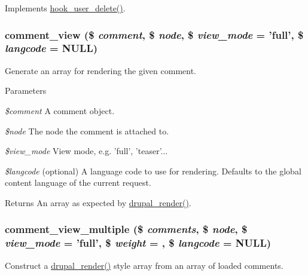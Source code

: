 \label{comment_8module_a9534e778a7cbfe56fd750997c8998ad8}
Implements \hyperlink{group__hooks_ga2c0755857e486e8a770b44b496da9929}{hook\_\-user\_\-delete()}. \hypertarget{comment_8module_a68dd73af772c948e0f8a6cb144bef2cf}{
\subsubsection[{comment\_\-view}]{\setlength{\rightskip}{0pt plus 5cm}comment\_\-view (\$ {\em comment}, \/  \$ {\em node}, \/  \$ {\em view\_\-mode} = {\ttfamily 'full'}, \/  \$ {\em langcode} = {\ttfamily NULL})}}
\label{comment_8module_a68dd73af772c948e0f8a6cb144bef2cf}
Generate an array for rendering the given comment.


\begin{DoxyParams}{Parameters}
\item[{\em \$comment}]A comment object. \item[{\em \$node}]The node the comment is attached to. \item[{\em \$view\_\-mode}]View mode, e.g. 'full', 'teaser'... \item[{\em \$langcode}](optional) A language code to use for rendering. Defaults to the global content language of the current request.\end{DoxyParams}
\begin{DoxyReturn}{Returns}
An array as expected by \hyperlink{common_8inc_a05798b44e8d6c496d4bee5cc32fa7851}{drupal\_\-render()}. 
\end{DoxyReturn}
\hypertarget{comment_8module_add3fefcb6c60f8785d2c11cd49994681}{
\subsubsection[{comment\_\-view\_\-multiple}]{\setlength{\rightskip}{0pt plus 5cm}comment\_\-view\_\-multiple (\$ {\em comments}, \/  \$ {\em node}, \/  \$ {\em view\_\-mode} = {\ttfamily 'full'}, \/  \$ {\em weight} = {}, \/  \$ {\em langcode} = {\ttfamily NULL})}}
\label{comment_8module_add3fefcb6c60f8785d2c11cd49994681}
Construct a \hyperlink{common_8inc_a05798b44e8d6c496d4bee5cc32fa7851}{drupal\_\-render()} style array from an array of loaded comments.


